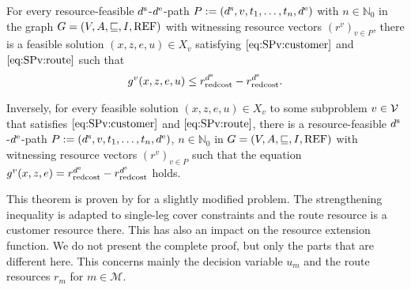 \begin{theorem}
\label{th:equivalence_SPv_MMILP}

For every resource-feasible $d^{\operatorname{s}}$-$d^{\operatorname{e}}$-path ${P:=\left(d^{\operatorname{s}},v,t_1,\dots,t_n,d^{\operatorname{e}}\right)}$ with $n\in\mathbb{N}_0$ in the graph ${G=\left(V,A,\sqsubseteq,I,\operatorname{REF}\right)}$ with witnessing resource vectors $\left(r^v\right)_{v\in P}$, there is a feasible solution ${(x,z,e,u)\in X_v}$ satisfying $\eqref{eq:SPv:customer}$ and $\eqref{eq:SPv:route}$ such that
\begin{align*}
	g^v(x,z,e,u)\leq r^{d^{\operatorname{e}}}_{\operatorname{redcost}} - r^{d^{\operatorname{s}}}_{\operatorname{redcost}}.
\end{align*}

Inversely, for every feasible solution ${(x,z,e,u)\in X_v}$ to some subproblem $v\in\mathcal{V}$ that satisfies $\eqref{eq:SPv:customer}$ and $\eqref{eq:SPv:route}$, there is a resource-feasible $d^{\operatorname{s}}$-$d^{\operatorname{e}}$-path ${P:=\left(d^{\operatorname{s}},v,t_1,\dots,t_n,d^{\operatorname{e}}\right)}$, $n\in\mathbb{N}_0$ in ${G=\left(V,A,\sqsubseteq,I,\operatorname{REF}\right)}$ with witnessing resource vectors $\left(r^v\right)_{v\in P}$ such that the equation ${g^v(x,z,e)=r^{d^{\operatorname{e}}}_{\operatorname{redcost}} - r^{d^{\operatorname{s}}}_{\operatorname{redcost}}}$ holds.

\end{theorem}

This theorem is proven by \cite[pp.~96-99]{Kaiser} for a slightly modified problem. The strengthening inequality is adapted to single-leg cover constraints and the route resource is a customer resource there. This has also an impact on the resource extension function. We do not present the complete proof, but only the parts that are different here. This concerns mainly the decision variable $u_m$ and the route resources $r_m$ for ${m\in\mathcal{M}}$.

